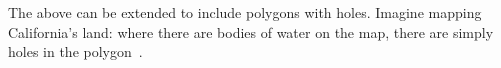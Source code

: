 The above can be extended to include polygons with holes. Imagine mapping California's land: where there are bodies of water on the map, there are simply holes in the polygon~\cite{gentle_intro}.

\begin{figure}
    \centering

      \hfill
        \hfill
{}
       \hfill
{}


\end{figure}
